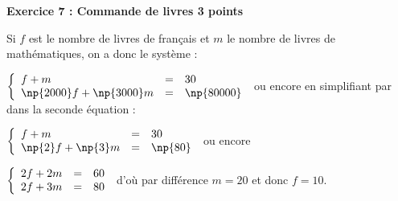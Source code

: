 \textbf{Exercice 7 : Commande de livres \hfill 3 points}

\medskip

%
%
%
Si $f$ est le nombre de livres de français et $m$ le nombre de livres de mathématiques, on a donc le système :

$\left\{\begin{array}{l c l}
f + m&=&30\\
\np{2000}f + \np{3000}m&=&\np{80000}
\end{array}\right.$ ou encore en simplifiant par  dans la seconde équation :

$\left\{\begin{array}{l c l}
f + m&=&30\\
\np{2}f + \np{3}m&=&\np{80}
\end{array}\right.$  ou encore 

$\left\{\begin{array}{l c l}
2f + 2m&=&60\\
2f + 3m&=&80
\end{array}\right.$ d’où par différence $m = 20$ et donc $f = 10$.
\vspace{0,5cm}

